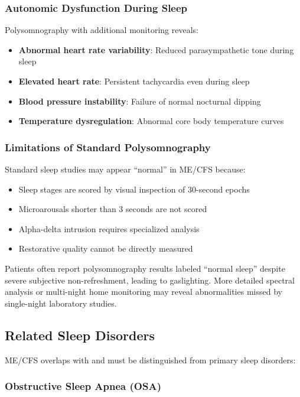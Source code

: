 \subsubsection{Autonomic Dysfunction During Sleep}

Polysomnography with additional monitoring reveals:
\begin{itemize}
    \item \textbf{Abnormal heart rate variability}: Reduced parasympathetic tone during sleep
    \item \textbf{Elevated heart rate}: Persistent tachycardia even during sleep
    \item \textbf{Blood pressure instability}: Failure of normal nocturnal dipping
    \item \textbf{Temperature dysregulation}: Abnormal core body temperature curves
\end{itemize}

\subsubsection{Limitations of Standard Polysomnography}

Standard sleep studies may appear ``normal'' in ME/CFS because:
\begin{itemize}
    \item Sleep stages are scored by visual inspection of 30-second epochs
    \item Microarousals shorter than 3 seconds are not scored
    \item Alpha-delta intrusion requires specialized analysis
    \item Restorative quality cannot be directly measured
\end{itemize}

Patients often report polysomnography results labeled ``normal sleep'' despite severe subjective non-refreshment, leading to gaslighting. More detailed spectral analysis or multi-night home monitoring may reveal abnormalities missed by single-night laboratory studies.

\subsection{Related Sleep Disorders}

ME/CFS overlaps with and must be distinguished from primary sleep disorders:

\subsubsection{Obstructive Sleep Apnea (OSA)}

